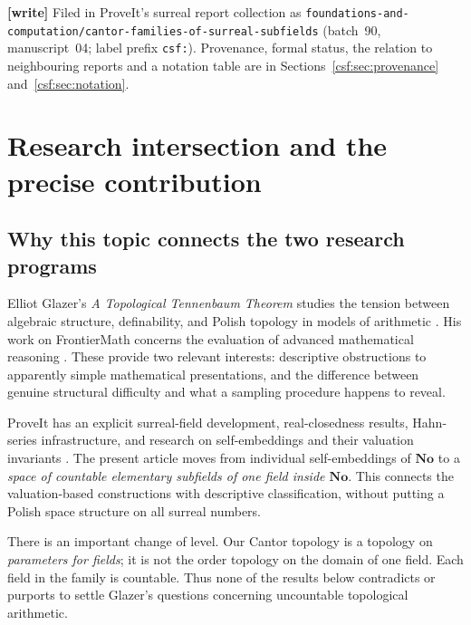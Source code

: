 \documentclass[11pt,a4paper]{article}
\numberwithin{equation}{section}
\theoremstyle{definition}
\theoremstyle{remark}
\newcommand{\No}{\mathbf{No}}
\newcommand{\repo}[1]{\nolinkurl{#1}}
\begin{document}
\begin{titlepage}
\smallskip
{\footnotesize\raggedright\noindent\textbf{[write]} Filed in ProveIt's surreal report collection as \repo{foundations-and-computation/cantor-families-of-surreal-subfields} (batch~90, manuscript~04; label prefix \texttt{csf:}). Provenance, formal status, the relation to neighbouring reports and a notation table are in Sections~\ref{csf:sec:provenance} and~\ref{csf:sec:notation}.\par}
\end{titlepage}
\hypersetup{pageanchor=true}

\tableofcontents
\newpage

\section{Research intersection and the precise contribution}
\label{csf:sec:intersection}

\subsection{Why this topic connects the two research programs}

Elliot Glazer's \emph{A Topological Tennenbaum Theorem} studies the tension
between algebraic structure, definability, and Polish topology in models of
arithmetic \cite{glazer}. His work on FrontierMath concerns the evaluation of
advanced mathematical reasoning \cite{frontier}. These provide two relevant
interests: descriptive obstructions to apparently simple mathematical
presentations, and the difference between genuine structural difficulty and
what a sampling procedure happens to reveal.

ProveIt has an explicit surreal-field development, real-closedness results,
Hahn-series infrastructure, and research on self-embeddings and their
valuation invariants \cite{proveit,sse}. The present article moves from
individual self-embeddings of $\No$ to a \emph{space of countable elementary
subfields of one field inside $\No$}. This connects the valuation-based
constructions with descriptive classification, without putting a Polish
space structure on all surreal numbers.

There is an important change of level. Our Cantor topology is a topology on
\emph{parameters for fields}; it is not the order topology on the domain of
one field. Each field in the family is countable. Thus none of the results
below contradicts or purports to settle Glazer's questions concerning
uncountable topological arithmetic.
\end{document}
